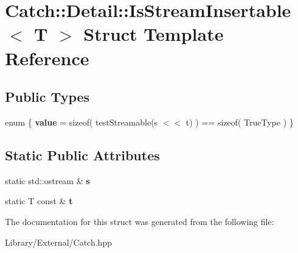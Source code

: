 \hypertarget{struct_catch_1_1_detail_1_1_is_stream_insertable}{}\section{Catch\+:\+:Detail\+:\+:Is\+Stream\+Insertable$<$ T $>$ Struct Template Reference}
\label{struct_catch_1_1_detail_1_1_is_stream_insertable}
\subsection*{Public Types}
\begin{DoxyCompactItemize}
\item 
\hypertarget{struct_catch_1_1_detail_1_1_is_stream_insertable_a2e4508694da3bf368ff67733a7970edd}{}enum \{ {\bfseries value} = sizeof( test\+Streamable(s $<$$<$ t) ) == sizeof( True\+Type )
 \}\label{struct_catch_1_1_detail_1_1_is_stream_insertable_a2e4508694da3bf368ff67733a7970edd}

\end{DoxyCompactItemize}
\subsection*{Static Public Attributes}
\begin{DoxyCompactItemize}
\item 
\hypertarget{struct_catch_1_1_detail_1_1_is_stream_insertable_abe3d3c8e5d85665747faafffc9a96b00}{}static std\+::ostream \& {\bfseries s}\label{struct_catch_1_1_detail_1_1_is_stream_insertable_abe3d3c8e5d85665747faafffc9a96b00}

\item 
\hypertarget{struct_catch_1_1_detail_1_1_is_stream_insertable_a7d2a3da978b6736667a7b2f6d51f507f}{}static T const \& {\bfseries t}\label{struct_catch_1_1_detail_1_1_is_stream_insertable_a7d2a3da978b6736667a7b2f6d51f507f}

\end{DoxyCompactItemize}


The documentation for this struct was generated from the following file\+:\begin{DoxyCompactItemize}
\item 
Library/\+External/Catch.\+hpp\end{DoxyCompactItemize}
